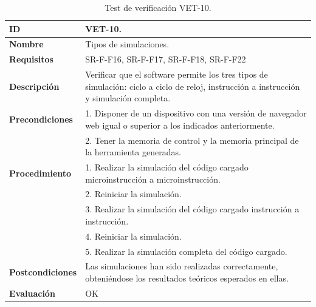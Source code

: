 \begin{center}
\begin{table}[htb]
\centering
\caption{Test de verificación VET-10.}
\begin{tabular}{@{}p{2.5cm} p{13cm}@{}} 
\toprule
\textbf{ID} 					& VET-10. \\
\midrule
\textbf{Nombre} 				& Tipos de simulaciones. \\
\midrule
\textbf{Requisitos} 		& SR-F-F16, SR-F-F17, SR-F-F18, SR-F-F22\\
\midrule
\textbf{Descripción} 		& Verificar que el software permite los tres tipos de simulación: ciclo a ciclo de reloj, instrucción a instrucción y simulación completa. \\
\midrule
\textbf{Precondiciones}		& 1. Disponer de un dispositivo con una versión de navegador web igual o superior a los indicados anteriormente. \\
											& 2. Tener la memoria de control y la memoria principal de la herramienta generadas. \\
\midrule
\textbf{Procedimiento}		& 1. Realizar la simulación del código cargado microinstrucción a microinstrucción.\\
											& 2. Reiniciar la simulación.\\
											& 3. Realizar la simulación del código cargado instrucción a instrucción.\\
											& 4. Reiniciar la simulación.\\
											& 5. Realizar la simulación completa del código cargado. \\
\midrule
\textbf{Postcondiciones} 		&  Las simulaciones han sido realizadas correctamente, obteniéndose los resultados teóricos esperados en ellas.\\
\midrule
\textbf{Evaluación} 			& OK \\
\bottomrule
\end{tabular}
\label{tab:vet10}
\end{table}
\end{center}

